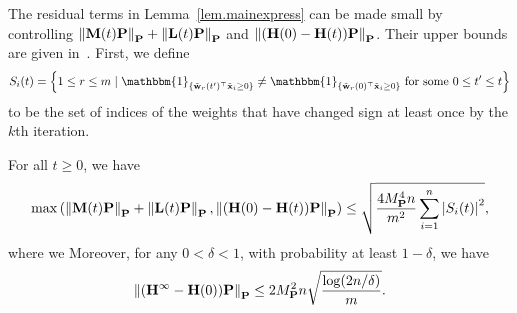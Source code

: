 The residual terms in Lemma~\ref{lem.mainexpress} can be made small by controlling $\left\lVert\mathbf{M}(t)\mathbf{P}\right\rVert_{\mathbf{P}} + \left\lVert\mathbf{L}(t)\mathbf{P}\right\rVert_{\mathbf{P}}$ and $\left\lVert(\mathbf{H}(0)-\mathbf{H}(t))\mathbf{P}\right\rVert_{\mathbf{P}}$. Their upper bounds are given in~. First, we define \begin{equation*}
    S_i(t) = \left\{1\leq r\leq m \mid \mathbbm{1}_{\{\tilde{\mathbf{w}}_r(t')^\top \tilde{\mathbf{x}}_i \geq 0\}} \neq \mathbbm{1}_{\{\tilde{\mathbf{w}}_r(0)^\top \tilde{\mathbf{x}}_i \geq 0\}}\text{ for some } 0\leq t'\leq t \right\}
\end{equation*}
to be the set of indices of the weights that have changed sign at least once by the $k$th iteration.
\begin{lem}\label{lem.controlevolmat}
For all $t \geq 0$, we have
\begin{equation*}
    \max \left( \left\lVert\mathbf{M}(t)\mathbf{P}\right\rVert_{\mathbf{P}} + \left\lVert\mathbf{L}(t)\mathbf{P}\right\rVert_{\mathbf{P}}, \left\lVert(\mathbf{H}(0)-\mathbf{H}(t))\mathbf{P}\right\rVert_{\mathbf{P}} \right)\leq \sqrt{\frac{4M_{\mathbf{P}}^4 n}{m^2} \sum_{i=1}^n \left|S_i(t)\right|^2},
\end{equation*}
where we  Moreover, for any $0 < \delta < 1$, with probability at least $1 - \delta$, we have
\begin{equation*}
    \left\lVert(\mathbf{H}^\infty - \mathbf{H}(0))\mathbf{P}\right\rVert_{\mathbf{P}} \leq 2 M_{\mathbf{P}}^2 n \sqrt{\frac{\log( 2n/\delta)}{m}}.
\end{equation*}
\end{lem}

